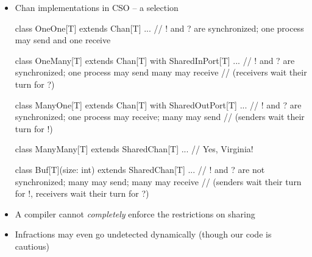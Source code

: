 \documentclass{concdistfoils}
\begin{document}
\begin{slide}
\begin{itemize}
\item {Chan implementations in CSO -- a selection}
\vfill
\begin{scala}
        class OneOne[T]  extends Chan[T] {...}
        // ! and ? are synchronized; one process may send and one receive
               
        class OneMany[T]  extends Chan[T] with SharedInPort[T] {...}
        // ! and ? are synchronized; one process may send many may receive
        // (receivers wait their turn for ?)
        
        class ManyOne[T] extends Chan[T] with SharedOutPort[T] {...}
        // ! and ? are synchronized; one process may receive; many may send
        // (senders wait their turn for !)
        
        class ManyMany[T] extends SharedChan[T] {...} // Yes, Virginia!
        
        class Buf[T](size: int) extends SharedChan[T] {...}
        // ! and ? are not synchronized; many may send; many may receive
        // (senders wait their turn for !, receivers wait their turn for ?)
\end{scala}
\end{itemize}
\vfill
\begin{smaller}
\begin{itemize}
\item A compiler cannot \textit{completely} enforce the restrictions on sharing 
\item Infractions may even go undetected dynamically (though our code is cautious)
\end{itemize}
\end{smaller}
\end{slide}
\end{document}
